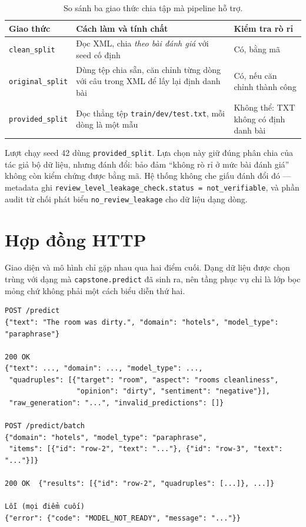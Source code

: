 \documentclass[12pt,a4paper]{report}
\newcommand{\enquote}[1]{“#1”}
\newcommand{\code}[1]{\texttt{#1}}
\begin{document}
\begin{table}[H]
\centering
\caption{So sánh ba giao thức chia tập mà pipeline hỗ trợ.}
\label{tab:giaothuc}
\begin{tabularx}{\linewidth}{@{}lXl@{}}
\toprule
\textbf{Giao thức} & \textbf{Cách làm và tính chất} & \textbf{Kiểm tra rò rỉ} \\
\midrule
\code{clean\_split} & Đọc XML, chia \emph{theo bài đánh giá} với seed cố định & Có, bằng mã \\
\code{original\_split} & Dùng tệp chia sẵn, căn chỉnh từng dòng với câu trong XML để lấy lại định danh bài & Có, nếu căn chỉnh thành công \\
\code{provided\_split} & Đọc thẳng tệp \code{train/dev/test.txt}, mỗi dòng là một mẫu & Không thể: TXT không có định danh bài \\
\bottomrule
\end{tabularx}
\end{table}

Lượt chạy seed 42 dùng \code{provided\_split}. Lựa chọn này giữ đúng phân chia của tác giả bộ dữ liệu, nhưng đánh đổi:
bảo đảm \enquote{không rò rỉ ở mức bài đánh giá} không còn kiểm chứng được bằng mã. Hệ thống không che giấu đánh đổi đó
--- metadata ghi \code{review\_level\_leakage\_check.status = not\_verifiable}, và phần audit từ chối phát biểu
\code{no\_review\_leakage} cho dữ liệu dạng dòng.

\section{Hợp đồng HTTP}

Giao diện và mô hình chỉ gặp nhau qua hai điểm cuối. Dạng dữ liệu được chọn trùng với dạng mà \code{capstone.predict} đã
sinh ra, nên tầng phục vụ chỉ là lớp bọc mỏng chứ không phải một cách biểu diễn thứ hai.

\begin{Verbatim}[fontsize=\small,frame=single,framesep=3mm]
POST /predict
{"text": "The room was dirty.", "domain": "hotels", "model_type": "paraphrase"}

200 OK
{"text": ..., "domain": ..., "model_type": ...,
 "quadruples": [{"target": "room", "aspect": "rooms cleanliness",
                 "opinion": "dirty", "sentiment": "negative"}],
 "raw_generation": "...", "invalid_predictions": []}

POST /predict/batch
{"domain": "hotels", "model_type": "paraphrase",
 "items": [{"id": "row-2", "text": "..."}, {"id": "row-3", "text": "..."}]}

200 OK  {"results": [{"id": "row-2", "quadruples": [...]}, ...]}

Lỗi (mọi điểm cuối)
{"error": {"code": "MODEL_NOT_READY", "message": "..."}}
\end{Verbatim}
\end{document}

